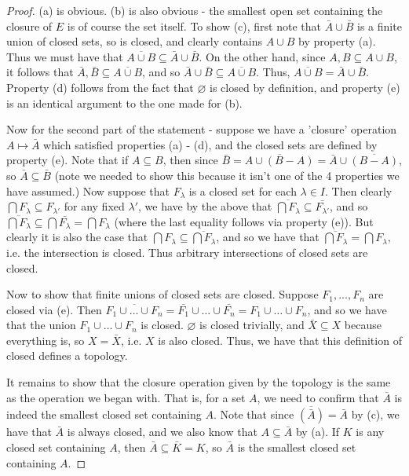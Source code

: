 \documentclass{article}
\theoremstyle{definition}
\theoremstyle{plain}
\theoremstyle{theorem}
\begin{document}
	\begin{proof}
		(a) is obvious. (b) is also obvious - the smallest open set containing the closure of $E$ is of course the set itself. To show (c), first note that $\bar{A} \cup \bar{B}$ is a finite union of closed sets, so is closed, and clearly contains $A \cup B$ by property (a). Thus we must have that $\overline{A \cup B} \subseteq \bar{A} \cup \bar{B}$. On the other hand, since $A,B \subseteq A \cup B$, it follows that $\bar{A},\bar{B} \subseteq \overline{A \cup B}$, and so $\bar{A} \cup \bar{B} \subseteq \overline{A \cup B}$. Thus, $\overline{A \cup B} = \bar{A} \cup \bar{B}$. Property (d) follows from the fact that $\varnothing$ is closed by definition, and property (e) is an identical argument to the one made for (b).
		\par Now for the second part of the statement - suppose we have a 'closure' operation $A \mapsto \bar{A}$ which satisfied properties (a) - (d), and the closed sets are defined by property (e). Note that if $A \subseteq B$, then since $\bar{B} = \overline{A \cup (B-A)} = \bar{A} \cup \overline{(B-A)}$, so $\bar{A} \subseteq \bar{B}$ (note we needed to show this because it isn't one of the 4 properties we have assumed.) Now suppose that $F_{\lambda}$ is a closed set for each $\lambda \in I$. Then clearly $\bigcap F_{\lambda} \subseteq F_{\lambda'}$ for any fixed $\lambda'$, we have by the above that $\overline{\bigcap F_{\lambda}} \subseteq \bar{F_{\lambda'}}$, and so $\overline{\bigcap F_{\lambda}} \subseteq \bigcap \bar{F_{\lambda}} = \bigcap F_{\lambda}$ (where the last equality follows via property (e)). But clearly it is also the case that $\bigcap F_{\lambda} \subseteq \overline{\bigcap F_{\lambda}}$, and so we have that $\overline{\bigcap F_{\lambda}}  = \bigcap F_{\lambda}$, i.e. the intersection is closed. Thus arbitrary intersections of closed sets are closed. 
	 \par Now to show that finite unions of closed sets are closed. Suppose $F_1,...,F_n$ are closed via (e). Then $\overline{F_1 \cup \ldots \cup F_n} = \bar{F_1} \cup \ldots \cup \bar{F_n} = F_1 \cup \ldots \cup F_n$, and so we have that the union $F_1 \cup \ldots \cup F_n$ is closed. $\varnothing$ is closed trivially, and $\bar{X} \subseteq X$ because everything is, so $X = \bar{X}$, i.e. $X$ is also closed. Thus, we have that this definition of closed defines a topology.
		\par It remains to show that the closure operation given by the topology is the same as the operation we began with. That is, for a set $A$, we need to confirm that $\bar{A}$ is indeed the smallest closed set containing $A$. Note that since $\overline{(\bar{A})} = \bar{A}$ by (c), we have that $\bar{A}$ is always closed, and we also know that $A \subseteq \bar{A}$ by (a). If $K$ is any closed set containing $A$, then $\bar{A} \subseteq \bar{K} = K$, so $\bar{A}$ is the smallest closed set containing $A$. 
	\end{proof}
\end{document}
